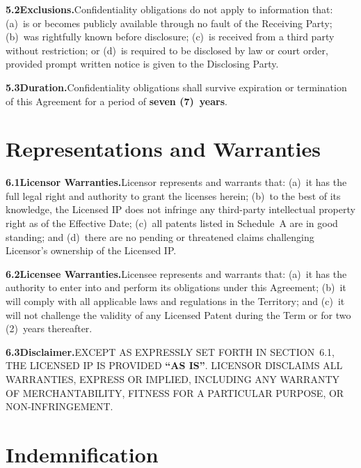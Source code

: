 \documentclass[11pt,a4paper]{article}
\newcommand{\defterm}[1]{\textbf{\color{NexaNavy}``#1''}}
\begin{document}
\textbf{5.2\enspace Exclusions.}\enspace Confidentiality obligations do not apply to
information that: (a)~is or becomes publicly available through no fault of the Receiving Party;
(b)~was rightfully known before disclosure; (c)~is received from a third party without
restriction; or (d)~is required to be disclosed by law or court order, provided prompt written
notice is given to the Disclosing Party.

\textbf{5.3\enspace Duration.}\enspace Confidentiality obligations shall survive expiration or
termination of this Agreement for a period of \textbf{seven (7)~years}.

\section{Representations and Warranties}

\textbf{6.1\enspace Licensor Warranties.}\enspace Licensor represents and warrants that:
(a)~it has the full legal right and authority to grant the licenses herein; (b)~to the best
of its knowledge, the Licensed IP does not infringe any third-party intellectual property
right as of the Effective Date; (c)~all patents listed in Schedule~A are in good standing;
and (d)~there are no pending or threatened claims challenging Licensor's ownership of the
Licensed IP.

\textbf{6.2\enspace Licensee Warranties.}\enspace Licensee represents and warrants that:
(a)~it has the authority to enter into and perform its obligations under this Agreement;
(b)~it will comply with all applicable laws and regulations in the Territory; and (c)~it will
not challenge the validity of any Licensed Patent during the Term or for two (2)~years
thereafter.

\textbf{6.3\enspace Disclaimer.}\enspace EXCEPT AS EXPRESSLY SET FORTH IN SECTION~6.1,
THE LICENSED IP IS PROVIDED \defterm{AS IS}. LICENSOR DISCLAIMS ALL WARRANTIES, EXPRESS OR
IMPLIED, INCLUDING ANY WARRANTY OF MERCHANTABILITY, FITNESS FOR A PARTICULAR PURPOSE, OR
NON-INFRINGEMENT.

\section{Indemnification}
\end{document}
